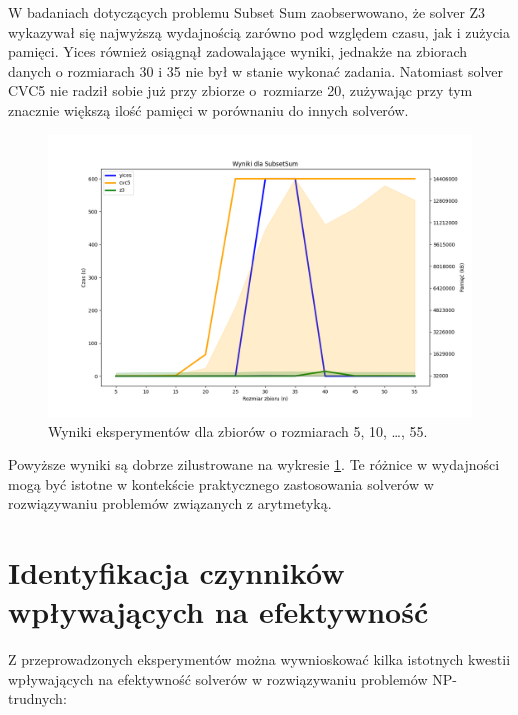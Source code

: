W badaniach dotyczących problemu Subset Sum zaobserwowano, że solver Z3 wykazywał się najwyższą wydajnością zarówno pod względem czasu, jak i zużycia pamięci. Yices również osiągnął zadowalające wyniki, jednakże na zbiorach danych o rozmiarach 30 i 35 nie był w stanie wykonać zadania. Natomiast solver CVC5 nie radził sobie już przy zbiorze o~rozmiarze 20, zużywając przy tym znacznie większą ilość pamięci w porównaniu do innych solverów. 

\begin{figure}[htbp]
	\centering
	\begin{minipage}{\textwidth}
		\includegraphics[width=\textwidth]{./figures/8-plot.png}
		\caption{Wyniki eksperymentów dla zbiorów o rozmiarach 5, 10, \dots, 55.}
		\label{fig:8}
	\end{minipage}
\end{figure}

Powyższe wyniki są dobrze zilustrowane na wykresie \ref{fig:8}. Te różnice w wydajności mogą być istotne w kontekście praktycznego zastosowania solverów w rozwiązywaniu problemów związanych z arytmetyką.

\section{Identyfikacja czynników wpływających na efektywność}

Z przeprowadzonych eksperymentów można wywnioskować kilka istotnych kwestii wpływających na efektywność solverów w rozwiązywaniu problemów NP-trudnych:

